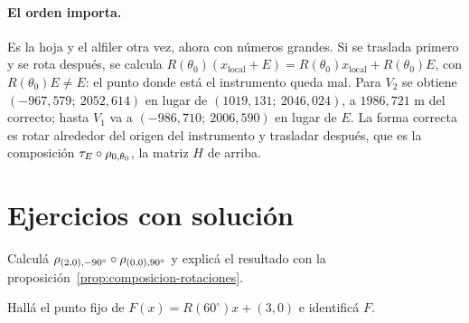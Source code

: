 \paragraph{El orden importa.} Es la hoja y el alfiler otra vez, ahora con números grandes.
Si se traslada primero y se rota después, se calcula
\(R(\theta_0)(x_{\text{local}}+E)=R(\theta_0)x_{\text{local}}+R(\theta_0)E\), con
\(R(\theta_0)E\neq E\): el punto donde está el instrumento queda mal. Para \(V_2\) se obtiene
\((-967{,}579;\ 2052{,}614)\) en lugar de \((1019{,}131;\ 2046{,}024)\), a \(1986{,}721\) m del
correcto; hasta \(V_1\) va a \((-986{,}710;\ 2006{,}590)\) en lugar de \(E\). La forma correcta es
rotar alrededor del origen del instrumento y trasladar después, que es la composición
\(\tau_E\circ\rho_{0,\theta_0}\), la matriz \(H\) de arriba.



\section{Ejercicios con solución}

\begin{ejercicio}
Calculá \(\rho_{(2,0),-90^\circ}\circ\rho_{(0,0),90^\circ}\) y explicá el resultado con la
proposición~\ref{prop:composicion-rotaciones}.
\end{ejercicio}

\begin{ejercicio}
Hallá el punto fijo de \(F(x)=R(60^\circ)x+(3,0)\) e identificá \(F\).
\end{ejercicio}

